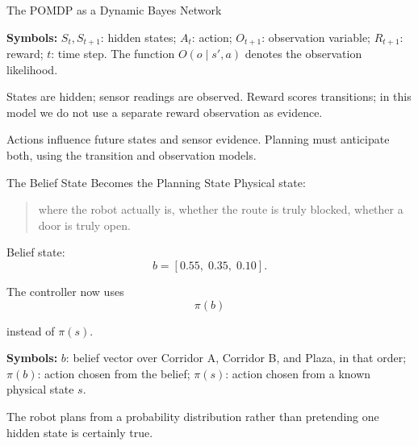 \documentclass[aspectratio=169,10pt]{beamer}
\newcommand{\equationlegend}[1]{%
  \par\smallskip
  \begingroup
    \setlength{\fboxsep}{4pt}%
    \noindent\colorbox{DeckSoft}{%
      \parbox{\dimexpr\linewidth-2\fboxsep\relax}{%
        \footnotesize\textbf{Symbols:} #1%
      }%
    }\par
  \endgroup
  \smallskip
}
\begin{document}
\begin{frame}{The POMDP as a Dynamic Bayes Network}
  \begin{center}
  \end{center}
  \equationlegend{$S_t,S_{t+1}$: hidden states; $A_t$: action; $O_{t+1}$: observation variable; $R_{t+1}$: reward; $t$: time step. The function $O(o\mid s',a)$ denotes the observation likelihood.}

  \small
  States are hidden; sensor readings are observed. Reward scores transitions; in this model we do not use a separate reward observation as evidence.
  \begin{keyidea}
    Actions influence future states and sensor evidence. Planning must anticipate both, using the transition and observation models.
  \end{keyidea}
\end{frame}

\begin{frame}[shrink=10]{The Belief State Becomes the Planning State}
  Physical state:
  \begin{quote}
    where the robot actually is, whether the route is truly blocked, whether a door is truly open.
  \end{quote}

  Belief state:
  \[
    b=[0.55,\;0.35,\;0.10].
  \]

  The controller now uses
  \[
    \pi(b)
  \]

  instead of $\pi(s)$.
  \equationlegend{$b$: belief vector over Corridor A, Corridor B, and Plaza, in that order; $\pi(b)$: action chosen from the belief; $\pi(s)$: action chosen from a known physical state $s$.}

  \begin{keyidea}
    The robot plans from a probability distribution rather than pretending one hidden state is certainly true.
  \end{keyidea}
\end{frame}
\end{document}
